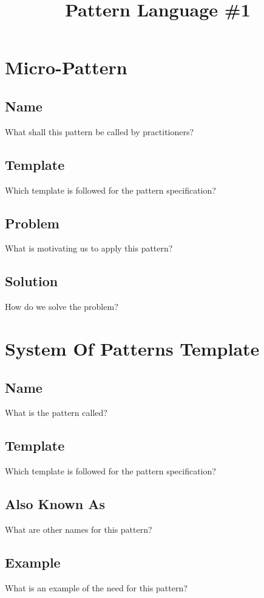 \documentclass{article}
\title{Pattern Language \#1}
\begin{document}
\maketitle


\section{Micro-Pattern}

\subsection{Name}
What shall this pattern be called by practitioners?

\subsection{Template}
Which template is followed for the pattern specification?

\subsection{Problem}
What is motivating us to apply this pattern?

\subsection{Solution}
How do we solve the problem?


\section{System Of Patterns Template}

\subsection{Name}
What is the pattern called?

\subsection{Template}
Which template is followed for the pattern specification?

\subsection{Also Known As}
What are other names for this pattern?

\subsection{Example}
What is an example of the need for this pattern?
\end{document}
